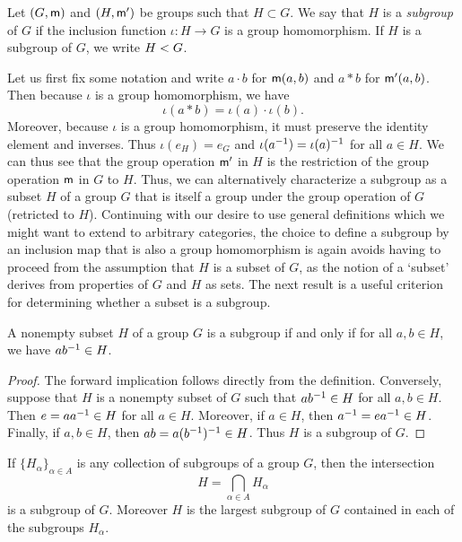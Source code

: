 \begin{definition}
    \label{def:subgroup}
    Let \((G, {\mathsf{m}})\) and \((H, {\mathsf{m}}')\) be groups such that \(H \subset G\).
    We say that \(H\) is a \emph{subgroup} of \(G\) if the inclusion function
    \(\iota : H \to G\) is a group homomorphism. If \(H\) is a subgroup of
    \(G\), we write \(H < G\).
\end{definition}

Let us first fix some notation and write \(a \cdot b\) for \({\mathsf{m}}(a,b)\) and
\(a * b\) for \({\mathsf{m}}'(a,b)\). Then because \(\iota\) is a group homomorphism,
we have
\[
    \iota(a * b) = \iota(a) \cdot \iota(b).
\]
Moreover, because \(\iota\) is a group homomorphism, it must preserve the
identity element and inverses. Thus \(\iota(e_H) = e_G\) and \(\iota(a^{-1}) =
\iota(a)^{-1}\) for all \(a \in H\). We can thus see that the group operation
\({\mathsf{m}}'\) in \(H\) is the restriction of the group operation \({\mathsf{m}}\) in \(G\)
to \(H\). Thus, we can alternatively characterize a subgroup as a subset \(H\)
of a group \(G\) that is itself a group under the group operation of \(G\)
(retricted to \(H\)). Continuing with our desire to use general definitions
which we might want to extend to arbitrary categories, the choice to define a
subgroup by an inclusion map that is also a group homomorphism is again avoids
having to proceed from the assumption that \(H\) is a subset of \(G\), as the
notion of a `subset' derives from properties of \(G\) and \(H\) as sets. The
next result is a useful criterion for determining whether a subset is a
subgroup.

\begin{theorem}
    \label{thm:subgroup-test}
    A nonempty subset \(H\) of a group \(G\) is a subgroup if and only if for
    all \(a, b \in H\), we have \(ab^{-1} \in H\).
\end{theorem}

\begin{proof}
    The forward implication follows directly from the definition. Conversely,
    suppose that \(H\) is a nonempty subset of \(G\) such that \(ab^{-1} \in H\)
    for all \(a, b \in H\). Then \(e = aa^{-1} \in H\) for all \(a \in H\).
    Moreover, if \(a \in H\), then \(a^{-1} = ea^{-1} \in H\). Finally, if \(a, b
    \in H\), then \(ab = a(b^{-1})^{-1} \in H\). Thus \(H\) is a subgroup of
    \(G\).
\end{proof}

\begin{theorem}
    \label{thm:intersection-subgroups}
    If \(\{H_{\alpha}\}_{\alpha \in A}\) is any collection of subgroups of a
    group \(G\), then the intersection
    \[
        H = \bigcap_{\alpha \in A} H_{\alpha}
    \]
    is a subgroup of \(G\). Moreover \(H\) is the largest subgroup of \(G\)
    contained in each of the subgroups \(H_{\alpha}\).
\end{theorem}

